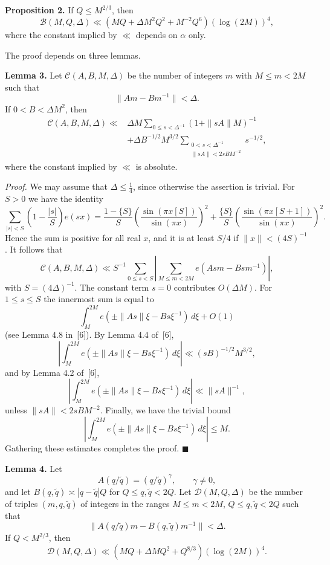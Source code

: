 \documentclass[10pt]{article}
\begin{document}
\medskip
\noindent\textbf{Proposition 2.}
If $Q\le M^{2/3}$, then
\begin{equation*}
  \mathscr B(M,Q,\Delta)
  \ll\left(MQ+\Delta M^2Q^2+M^{-2}Q^6\right)(\log(2M))^4,
  \tag{4.2}
\end{equation*}
where the constant implied by $\ll$ depends on $\alpha$ only.

The proof depends on three lemmas.

\medskip
\noindent\textbf{Lemma 3.}
Let $\mathscr C(A,B,M,\Delta)$ be the number of integers $m$ with
$M\le m<2M$ such that
\[
  \|Am-Bm^{-1}\|<\Delta.
\]
If $0<B<\Delta M^2$, then
\[
  \begin{aligned}
  \mathscr C(A,B,M,\Delta)\ll{}&
  \Delta M\sum_{0\le s<\Delta^{-1}}(1+\|sA\|M)^{-1}\\
  &+\Delta B^{-1/2}M^{3/2}
  \sum_{\substack{0<s<\Delta^{-1}\\
                   \|sA\|<2sBM^{-2}}}s^{-1/2},
  \end{aligned}
\]
where the constant implied by $\ll$ is absolute.

\medskip
\noindent\textit{Proof.}
We may assume that $\Delta\le\frac14$, since otherwise the assertion is
trivial. For $S>0$ we have the identity
\[
  \sum_{|s|<S}\left(1-\frac{|s|}{S}\right)e(sx)
  =\frac{1-\{S\}}{S}\left(\frac{\sin(\pi x[S])}{\sin(\pi x)}\right)^2
  +\frac{\{S\}}{S}\left(\frac{\sin(\pi x[S+1])}{\sin(\pi x)}\right)^2.
\]
Hence the sum is positive for all real $x$, and it is at least $S/4$ if
$\|x\|<(4S)^{-1}$. It follows that
\[
  \mathscr C(A,B,M,\Delta)
  \ll S^{-1}\sum_{0\le s<S}
  \left|\sum_{M\le m<2M}e(Asm-Bsm^{-1})\right|,
\]
with $S=(4\Delta)^{-1}$. The constant term $s=0$ contributes
$O(\Delta M)$. For $1\le s\le S$ the innermost sum is equal to
\[
  \int_M^{2M}e(\pm\|As\|\xi-Bs\xi^{-1})\,d\xi+O(1)
\]
(see Lemma 4.8 in~[6]). By Lemma 4.4 of~[6],
\[
  \left|\int_M^{2M}e(\pm\|As\|\xi-Bs\xi^{-1})\,d\xi\right|
  \ll(sB)^{-1/2}M^{3/2},
\]
and by Lemma 4.2 of~[6],
\[
  \left|\int_M^{2M}e(\pm\|As\|\xi-Bs\xi^{-1})\,d\xi\right|
  \ll\|sA\|^{-1},
\]
unless $\|sA\|<2sBM^{-2}$. Finally, we have the trivial bound
\[
  \left|\int_M^{2M}e(\pm\|As\|\xi-Bs\xi^{-1})\,d\xi\right|\le M.
\]
Gathering these estimates completes the proof. \(\blacksquare\)

\medskip
\noindent\textbf{Lemma 4.}
Let
\[
  A(q/\widetilde q)=(q/\widetilde q)^\gamma,\qquad \gamma\ne0,
\]
and let $B(q,\widetilde q)\asymp|q-\widetilde q|Q$ for
$Q\le q,\widetilde q<2Q$. Let $\mathscr D(M,Q,\Delta)$ be the number of
triples $(m,q,\widetilde q)$ of integers in the ranges
$M\le m<2M$, $Q\le q,\widetilde q<2Q$ such that
\[
  \|A(q/\widetilde q)m-B(q,\widetilde q)m^{-1}\|<\Delta.
\]
If $Q<M^{2/3}$, then
\[
  \mathscr D(M,Q,\Delta)
  \ll\left(MQ+\Delta MQ^2+Q^{8/3}\right)(\log(2M))^4.
\]
\end{document}
